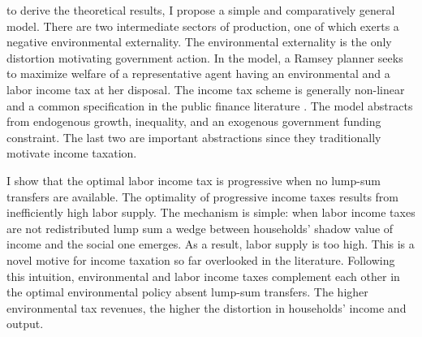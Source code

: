 to derive the theoretical results, I propose a simple and comparatively general model. There are two intermediate sectors of production, one of which exerts a negative environmental externality. The environmental externality is the only distortion motivating government action. In the model, a Ramsey planner seeks to maximize welfare of a representative agent having  an environmental and a labor income tax at her disposal. The income tax scheme is generally non-linear and a common specification in the public finance literature \citep[e.g.][]{Benabou2002TaxEfficiency, Heathcote2017OptimalFramework}.
The model abstracts from  endogenous growth, inequality, and an exogenous government funding constraint. The last two are important abstractions since they traditionally motivate income taxation.

I show that the optimal labor income tax is progressive when no lump-sum transfers are available. 
The optimality of progressive income taxes results from inefficiently high labor supply. The mechanism is simple: when labor income taxes are not redistributed lump sum a wedge between households' shadow value of income and the social one emerges.  As a result, labor supply is too high. 
This is a novel motive for income taxation so far overlooked in the literature.
Following this intuition, environmental and labor income taxes complement each other in the optimal environmental policy absent lump-sum transfers. The higher environmental tax revenues, the higher the distortion in households' income and output. 
  
